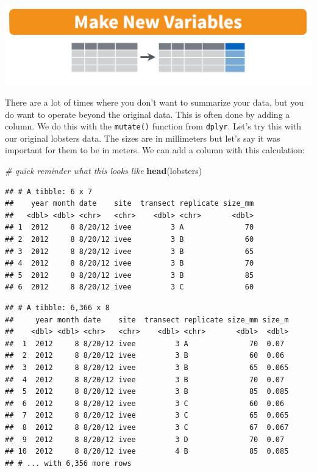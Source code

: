\documentclass[]{book}
\newenvironment{Shaded}{\begin{snugshade}}{\end{snugshade}}
\newcommand{\CommentTok}[1]{\textcolor[rgb]{0.56,0.35,0.01}{\textit{#1}}}
\newcommand{\DataTypeTok}[1]{\textcolor[rgb]{0.13,0.29,0.53}{#1}}
\newcommand{\DecValTok}[1]{\textcolor[rgb]{0.00,0.00,0.81}{#1}}
\newcommand{\KeywordTok}[1]{\textcolor[rgb]{0.13,0.29,0.53}{\textbf{#1}}}
\newcommand{\NormalTok}[1]{#1}
\newcommand{\OperatorTok}[1]{\textcolor[rgb]{0.81,0.36,0.00}{\textbf{#1}}}
\newcommand{\StringTok}[1]{\textcolor[rgb]{0.31,0.60,0.02}{#1}}
\begin{document}
\includegraphics[width=0.8\linewidth]{img/rstudio-cheatsheet-mutate}

There are a lot of times where you don't want to summarize your data, but you do want to operate beyond the original data. This is often done by adding a column. We do this with the \texttt{mutate()} function from \texttt{dplyr}. Let's try this with our original lobsters data. The sizes are in millimeters but let's say it was important for them to be in meters. We can add a column with this calculation:

\begin{Shaded}
\begin{Highlighting}[]
\CommentTok{# quick reminder what this looks like}
\KeywordTok{head}\NormalTok{(lobsters)}
\end{Highlighting}
\end{Shaded}

\begin{verbatim}
## # A tibble: 6 x 7
##    year month date    site  transect replicate size_mm
##   <dbl> <dbl> <chr>   <chr>    <dbl> <chr>       <dbl>
## 1  2012     8 8/20/12 ivee         3 A              70
## 2  2012     8 8/20/12 ivee         3 B              60
## 3  2012     8 8/20/12 ivee         3 B              65
## 4  2012     8 8/20/12 ivee         3 B              70
## 5  2012     8 8/20/12 ivee         3 B              85
## 6  2012     8 8/20/12 ivee         3 C              60
\end{verbatim}

\begin{Shaded}
\end{Shaded}

\begin{verbatim}
## # A tibble: 6,366 x 8
##     year month date    site  transect replicate size_mm size_m
##    <dbl> <dbl> <chr>   <chr>    <dbl> <chr>       <dbl>  <dbl>
##  1  2012     8 8/20/12 ivee         3 A              70  0.07 
##  2  2012     8 8/20/12 ivee         3 B              60  0.06 
##  3  2012     8 8/20/12 ivee         3 B              65  0.065
##  4  2012     8 8/20/12 ivee         3 B              70  0.07 
##  5  2012     8 8/20/12 ivee         3 B              85  0.085
##  6  2012     8 8/20/12 ivee         3 C              60  0.06 
##  7  2012     8 8/20/12 ivee         3 C              65  0.065
##  8  2012     8 8/20/12 ivee         3 C              67  0.067
##  9  2012     8 8/20/12 ivee         3 D              70  0.07 
## 10  2012     8 8/20/12 ivee         4 B              85  0.085
## # ... with 6,356 more rows
\end{verbatim}
\end{document}

